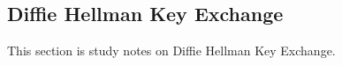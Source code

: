 \documentclass[12pt]{article}
\begin{document}
\maketitle
\pagebreak



\pagebreak
\vspace*{\fill}
\begin{center}
\section{Diffie Hellman Key Exchange}
This section is study notes on Diffie Hellman Key Exchange.
\end{center}
\vspace*{\fill}
\pagebreak
\end{document}
